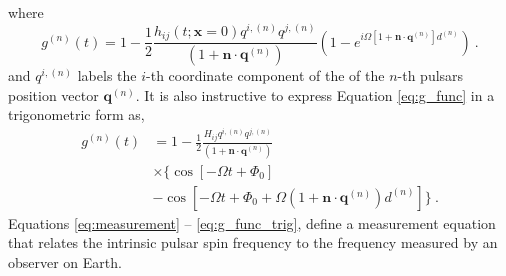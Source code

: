 \documentclass[fleqn,usenatbib,useAMS]{mnras}
\begin{document}
where
\begin{equation}
	g^{(n)}(t) = 1 -  \frac{1}{2} \frac{h_{ij} (t; \boldsymbol{x}= 0)q^{i,(n)} q^{j,(n)}}{(1 + \boldsymbol{n}\cdot \boldsymbol{q}^{(n)}) }  \left(1 -e^{i \Omega \left[1 + \boldsymbol{n}\cdot \boldsymbol{q}^{(n)} \right]  d^{(n)}}\right) \ .
	\label{eq:g_func}
\end{equation}
and $q^{i,(n)}$ labels the $i$-th coordinate component of the of the $n$-th pulsars position vector $\boldsymbol{q}^{(n)}$. It is also instructive to express Equation \eqref{eq:g_func} in a trigonometric form as,
\begin{align}
	g^{(n)}(t) &= 1 - \frac{1}{2} \frac{ H_{ij}q^{i,(n)} q^{j,(n)} }{(1 + \boldsymbol{n}\cdot \boldsymbol{q}^{(n)}) } \nonumber \\
	& \times \Big\{ \cos\left[-\Omega t +\Phi_0\right] \nonumber \\
	&- \cos \left[-\Omega t +\Phi_0 + \Omega \left(1 + \boldsymbol{n}\cdot \boldsymbol{q}^{(n)} \right)  d^{(n)} \right] \Big\} \ .
	\label{eq:g_func_trig}
\end{align}
Equations \eqref{eq:measurement} -- \eqref{eq:g_func_trig},  define a measurement equation that relates the intrinsic pulsar spin frequency to the frequency measured by an observer on Earth. 
\end{document}
